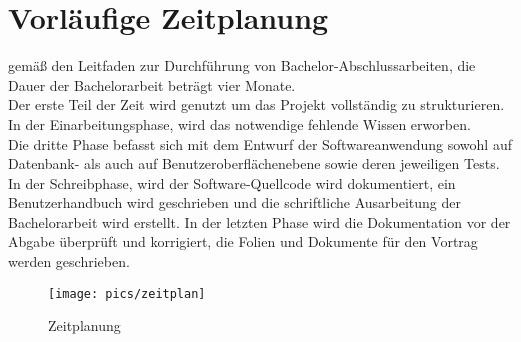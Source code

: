 \section{Vorläufige Zeitplanung}
gemäß den Leitfaden zur Durchführung von Bachelor-Abschlussarbeiten\cite{Boles:2015}, die Dauer der Bachelorarbeit beträgt vier Monate.\\
Der erste Teil der Zeit wird genutzt um das Projekt vollständig zu strukturieren. In der Einarbeitungsphase, wird das notwendige fehlende Wissen erworben.\\
Die dritte Phase befasst sich mit dem Entwurf der Softwareanwendung sowohl auf Datenbank- als auch auf Benutzeroberflächenebene sowie deren jeweiligen Tests.\\
In der Schreibphase, wird der Software-Quellcode wird dokumentiert, ein Benutzerhandbuch wird geschrieben und die schriftliche Ausarbeitung der Bachelorarbeit wird erstellt.
In der letzten Phase wird die Dokumentation vor der Abgabe überprüft und korrigiert, die Folien und Dokumente für den Vortrag werden geschrieben.

\begin{figure}[hp]%
    \centering
    \texttt{[image: pics/zeitplan]}\\
    \caption{Zeitplanung}
\end{figure}
